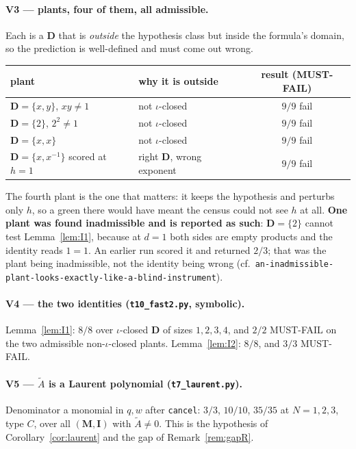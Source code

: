 \documentclass[11pt]{article}
\theoremstyle{definition}
\newcommand{\At}{\widetilde{A}}
\newcommand{\bM}{\mathbf{M}}
\newcommand{\bI}{\mathbf{I}}
\newcommand{\bD}{\mathbf{D}}
\begin{document}
\paragraph{V3 --- plants, four of them, all admissible.}
Each is a $\bD$ that is \emph{outside} the hypothesis class but inside the
formula's domain, so the prediction is well-defined and must come out wrong.
\begin{center}
\begin{tabular}{llc}
\toprule
plant & why it is outside & result (MUST-FAIL)\\\midrule
$\bD=\{x,y\}$, $xy\ne1$ & not $\iota$-closed & $9/9$ fail\\
$\bD=\{2\}$, $2^{2}\ne1$ & not $\iota$-closed & $9/9$ fail\\
$\bD=\{x,x\}$ & not $\iota$-closed & $9/9$ fail\\
$\bD=\{x,x^{-1}\}$ scored at $h=1$ & right $\bD$, wrong exponent & $9/9$ fail\\
\bottomrule
\end{tabular}
\end{center}
The fourth plant is the one that matters: it keeps the hypothesis and perturbs
only $h$, so a green there would have meant the census could not see $h$ at all.
\textbf{One plant was found inadmissible and is reported as such}: $\bD=\{2\}$
cannot test Lemma~\ref{lem:I1}, because at $d=1$ both sides are empty products
and the identity reads $1=1$.  An earlier run scored it and returned $2/3$; that
was the plant being inadmissible, not the identity being wrong
(cf.\ \texttt{an-inadmissible-plant-looks-exactly-like-a-blind-instrument}).

\paragraph{V4 --- the two identities (\texttt{t10\_fast2.py}, symbolic).}
Lemma~\ref{lem:I1}: $8/8$ over $\iota$-closed $\bD$ of sizes $1,2,3,4$, and
$2/2$ MUST-FAIL on the two admissible non-$\iota$-closed plants.
Lemma~\ref{lem:I2}: $8/8$, and $3/3$ MUST-FAIL.

\paragraph{V5 --- $\At$ is a Laurent polynomial (\texttt{t7\_laurent.py}).}
Denominator a monomial in $q,w$ after \texttt{cancel}: $3/3$, $10/10$, $35/35$ at
$N=1,2,3$, type $C$, over all $(\bM,\bI)$ with $\At\ne0$.  This is the hypothesis
of Corollary~\ref{cor:laurent} and the gap of Remark~\ref{rem:gapR}.
\end{document}
